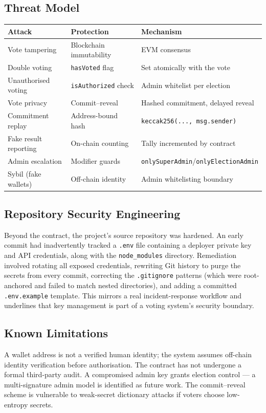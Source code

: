 \documentclass[11pt]{article}
\begin{document}
\subsection{Threat Model}
\begin{center}
\begin{tabular}{@{}lll@{}}
\toprule
\textbf{Attack} & \textbf{Protection} & \textbf{Mechanism} \\
\midrule
Vote tampering & Blockchain immutability & EVM consensus \\
Double voting & \texttt{hasVoted} flag & Set atomically with the vote \\
Unauthorised voting & \texttt{isAuthorized} check & Admin whitelist per election \\
Vote privacy & Commit--reveal & Hashed commitment, delayed reveal \\
Commitment replay & Address-bound hash & \texttt{keccak256(..., msg.sender)} \\
Fake result reporting & On-chain counting & Tally incremented by contract \\
Admin escalation & Modifier guards & \texttt{onlySuperAdmin}/\texttt{onlyElectionAdmin} \\
Sybil (fake wallets) & Off-chain identity & Admin whitelisting boundary \\
\bottomrule
\end{tabular}
\end{center}

\subsection{Repository Security Engineering}
Beyond the contract, the project's source repository was hardened. An early commit had
inadvertently tracked a \texttt{.env} file containing a deployer private key and API
credentials, along with the \texttt{node\_modules} directory. Remediation involved rotating
all exposed credentials, rewriting Git history to purge the secrets from every commit,
correcting the \texttt{.gitignore} patterns (which were root-anchored and failed to match
nested directories), and adding a committed \texttt{.env.example} template. This mirrors a
real incident-response workflow and underlines that key management is part of a voting
system's security boundary.

\subsection{Known Limitations}
A wallet address is not a verified human identity; the system assumes off-chain identity
verification before authorisation. The contract has not undergone a formal third-party
audit. A compromised admin key grants election control --- a multi-signature admin model is
identified as future work. The commit--reveal scheme is vulnerable to weak-secret dictionary
attacks if voters choose low-entropy secrets.
\end{document}
